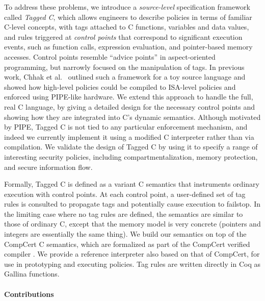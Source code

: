 \documentclass{llncs}
\begin{document}
To address these problems, we introduce a \emph{source-level} specification framework called \emph{Tagged C},
which allows engineers to describe policies in terms of familiar C-level concepts, with tags attached to
C functions, variables and data values, and rules triggered at \emph{control points} that correspond to
significant execution events, such as function calls, expression evaluation, and pointer-based memory accesses. 
Control points resemble ``advice points'' in aspect-oriented programming, but narrowly
focused on the manipulation of tags.
In previous work, Chhak et al.~\cite{Chhak21:Tagine} outlined such a framework for a toy
source language and showed how high-level policies could be compiled to ISA-level policies and 
enforced using PIPE-like hardware.  We extend this approach to handle
the full, real C language, by giving a detailed design for the necessary control points and
showing how they are integrated into C's dynamic semantics. 
Although motivated by PIPE, Tagged C is not tied to any particular enforcement mechanism,
and indeed we currently implement it using a modified C interpreter rather than via compilation.
We validate the design of Tagged C by using it to specify a range of interesting security policies,
including compartmentalization, memory protection, and secure information flow.


Formally, Tagged C is defined as a variant C semantics that instruments ordinary execution with control points.
At each control point, a user-defined set of tag rules is consulted to propagate tags and potentially cause
execution to failstop. In the limiting case where no tag rules are defined, the semantics are similar to
those of ordinary C, except that the memory model is very concrete
  (pointers and integers are essentially the same thing).
  We build our semantics on top of the CompCert C semantics, which are formalized 
  as part of the CompCert verified compiler \cite{Leroy09:CompCert}. We provide a reference interpreter
  also based on that of CompCert, for use in prototyping and executing policies. Tag rules are written directly in Coq as Gallina
  functions.

\paragraph{Contributions}
\end{document}
